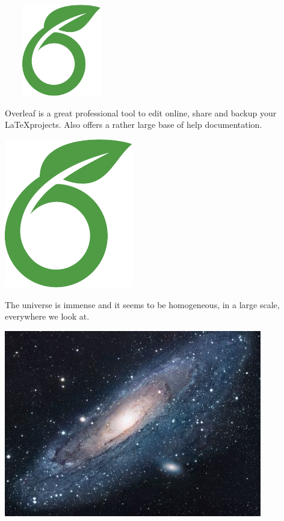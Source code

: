\documentclass{article}
\begin{document}
\includegraphics[width=5cm, height=4cm]{overleaf-logo}

\vspace{1.5cm}

Overleaf is a great professional tool to edit online, 
share and backup your \LaTeX projects. Also offers a 
rather large base of help documentation.

\includegraphics[scale=1.2, angle=45]{overleaf-logo}

\newpage

The universe is immense and it seems to be homogeneous, in a large scale, everywhere we look at.

\includegraphics[width=\textwidth]{universe}
\end{document}
